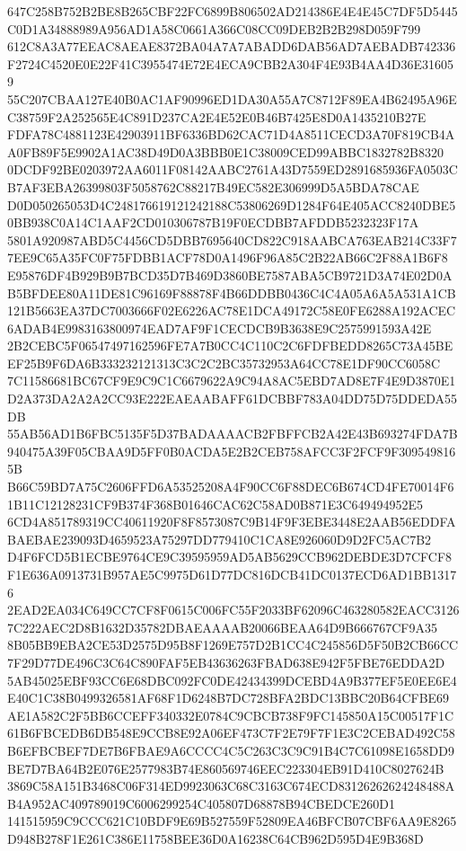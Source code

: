 \documentclass[UTF8,fontset=fandol,zihao=-4,a4paper]{ctexart}
\begin{document}
{{647C258B752B2BE8B265CBF22FC6899B806502AD214386E4E4E45C7DF5D5445C0D1A34888989A956AD1A58C0661A366C08CC09DEB2B2B298D059F799
612C8A3A77EEAC8AEAE8372BA04A7A7ABADD6DAB56AD7AEBADB742336F2724C4520E0E22F41C3955474E72E4ECA9CBB2A304F4E93B4AA4D36E316059
55C207CBAA127E40B0AC1AF90996ED1DA30A55A7C8712F89EA4B62495A96EC38759F2A252565E4C891D237CA2E4E52E0B46B7425E8D0A1435210B27E
FDFA78C4881123E42903911BF6336BD62CAC71D4A8511CECD3A70F819CB4AA0FB89F5E9902A1AC38D49D0A3BBB0E1C38009CED99ABBC1832782B8320
0DCDF92BE0203972AA6011F08142AABC2761A43D7559ED2891685936FA0503CB7AF3EBA26399803F5058762C88217B49EC582E306999D5A5BDA78CAE
D0D050265053D4C248176619121242188C53806269D1284F64E405ACC8240DBE50BB938C0A14C1AAF2CD010306787B19F0ECDBB7AFDDB5232323F17A
5801A920987ABD5C4456CD5DBB7695640CD822C918AABCA763EAB214C33F77EE9C65A35FC0F75FDBB1ACF78D0A1496F96A85C2B22AB66C2F88A1B6F8
E95876DF4B929B9B7BCD35D7B469D3860BE7587ABA5CB9721D3A74E02D0AB5BFDEE80A11DE81C96169F88878F4B66DDBB0436C4C4A05A6A5A531A1CB
121B5663EA37DC7003666F02E6226AC78E1DCA49172C58E0FE6288A192ACEC6ADAB4E9983163800974EAD7AF9F1CECDCB9B3638E9C2575991593A42E
2B2CEBC5F06547497162596FE7A7B0CC4C110C2C6FDFBEDD8265C73A45BEEF25B9F6DA6B333232121313C3C2C2BC35732953A64CC78E1DF90CC6058C
7C11586681BC67CF9E9C9C1C6679622A9C94A8AC5EBD7AD8E7F4E9D3870E1D2A373DA2A2A2CC93E222EAEAABAFF61DCBBF783A04DD75D75DDEDA55DB
55AB56AD1B6FBC5135F5D37BADAAAACB2FBFFCB2A42E43B693274FDA7B940475A39F05CBAA9D5FF0B0ACDA5E2B2CEB758AFCC3F2FCF9F3095498165B
B66C59BD7A75C2606FFD6A53525208A4F90CC6F88DEC6B674CD4FE70014F61B11C12128231CF9B374F368B01646CAC62C58AD0B871E3C649494952E5
6CD4A851789319CC40611920F8F8573087C9B14F9F3EBE3448E2AAB56EDDFABAEBAE239093D4659523A75297DD779410C1CA8E926060D9D2FC5AC7B2
D4F6FCD5B1ECBE9764CE9C39595959AD5AB5629CCB962DEBDE3D7CFCF8F1E636A0913731B957AE5C9975D61D77DC816DCB41DC0137ECD6AD1BB13176
2EAD2EA034C649CC7CF8F0615C006FC55F2033BF62096C463280582EACC31267C222AEC2D8B1632D35782DBAEAAAAB20066BEAA64D9B666767CF9A35
8B05BB9EBA2CE53D2575D95B8F1269E757D2B1CC4C245856D5F50B2CB66CC7F29D77DE496C3C64C890FAF5EB43636263FBAD638E942F5FBE76EDDA2D
5AB45025EBF93CC6E68DBC092FC0DE42434399DCEBD4A9B377EF5E0EE6E4E40C1C38B0499326581AF68F1D6248B7DC728BFA2BDC13BBC20B64CFBE69
AE1A582C2F5BB6CCEFF340332E0784C9CBCB738F9FC145850A15C00517F1C61B6FBCEDB6DB548E9CCB8E92A06EF473C7F2E79F7F1E3C2CEBAD492C58
B6EFBCBEF7DE7B6FBAE9A6CCCC4C5C263C3C9C91B4C7C61098E1658DD9BE7D7BA64B2E076E2577983B74E860569746EEC223304EB91D410C8027624B
3869C58A151B3468C06F314ED9923063C68C3163C674ECD83126262624248488AB4A952AC409789019C6006299254C405807D68878B94CBEDCE260D1
141515959C9CCC621C10BDF9E69B527559F52809EA46BFCB07CBF6AA9E8265D948B278F1E261C386E11758BEE36D0A16238C64CB962D595D4E9B368D
}}
\end{document}
